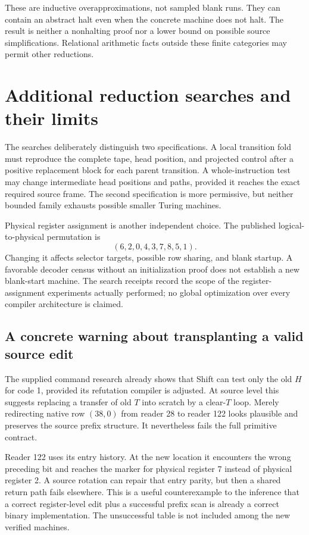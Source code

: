 \documentclass[11pt,letterpaper]{article}
\begin{document}
These are inductive overapproximations, not sampled blank runs. They
can contain an abstract halt even when the concrete machine does not
halt. The result is neither a nonhalting proof nor a lower bound on
possible source simplifications. Relational arithmetic facts outside
these finite categories may permit other reductions.

\section{Additional reduction searches and their limits}



The searches deliberately distinguish two specifications. A local
transition fold must reproduce the complete tape, head position, and
projected control after a positive replacement block for each parent
transition. A whole-instruction test may change intermediate head
positions and paths, provided it reaches the exact required source
frame. The second specification is more permissive, but neither
bounded family exhausts possible smaller Turing machines.

Physical register assignment is another independent choice. The
published logical-to-physical permutation is
\[
 (6,2,0,4,3,7,8,5,1).
\]
Changing it affects selector targets, possible row sharing, and blank
startup. A favorable decoder census without an initialization proof
does not establish a new blank-start machine. The search receipts
record the scope of the register-assignment experiments actually
performed; no global optimization over every compiler architecture is
claimed.

\subsection{A concrete warning about transplanting a valid source edit}

The supplied command research already shows that Shift can test only
the old \(H\) for code 1, provided its refutation compiler is adjusted.
At source level this suggests replacing a transfer of old \(T\) into
scratch by a clear-\(T\) loop. Merely redirecting native row \((38,0)\)
from reader 28 to reader 122 looks plausible and preserves the source
prefix structure. It nevertheless fails the full primitive contract.

Reader 122 uses its entry history. At the new location it encounters
the wrong preceding bit and reaches the marker for physical register 7
instead of physical register 2. A source rotation can repair that entry
parity, but then a shared return path fails elsewhere. This is a useful
counterexample to the inference that a correct register-level edit plus
a successful prefix scan is already a correct binary implementation.
The unsuccessful table is not included among the new verified machines.
\end{document}
